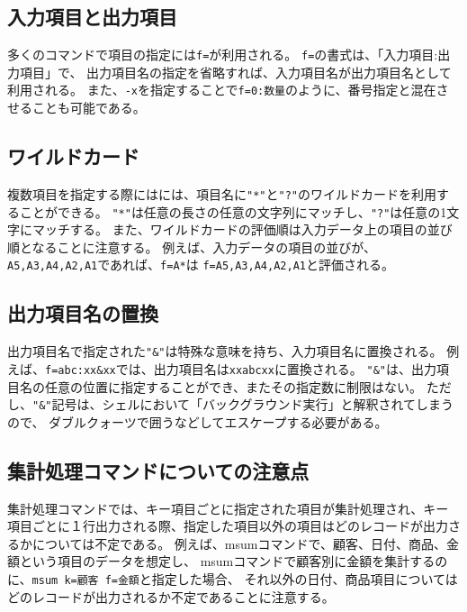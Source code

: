 

\subsection{入力項目と出力項目}

多くのコマンドで項目の指定には\verb|f=|が利用される。
\verb|f=|の書式は、「入力項目:出力項目」で、
出力項目名の指定を省略すれば、入力項目名が出力項目名として利用される。
また、\verb|-x|を指定することで\verb|f=0:数量|のように、番号指定と混在させることも可能である。



\subsection{ワイルドカード}
複数項目を指定する際にはには、項目名に\verb|"*"|と\verb|"?"|のワイルドカードを利用することができる。
\verb|"*"|は任意の長さの任意の文字列にマッチし、\verb|"?"|は任意の1文字にマッチする。
また、ワイルドカードの評価順は入力データ上の項目の並び順となることに注意する。
例えば、入力データの項目の並びが、\verb|A5,A3,A4,A2,A1|であれば、\verb|f=A*|は
\verb|f=A5,A3,A4,A2,A1|と評価される。



\subsection{出力項目名の置換}

出力項目名で指定された\verb|"&"|は特殊な意味を持ち、入力項目名に置換される。
例えば、\verb|f=abc:xx&xx|では、出力項目名は\verb|xxabcxx|に置換される。
\verb|"&"|は、出力項目名の任意の位置に指定することができ、またその指定数に制限はない。
ただし、\verb|"&"|記号は、シェルにおいて「バックグラウンド実行」と解釈されてしまうので、
ダブルクォーツで囲うなどしてエスケープする必要がある。



\subsection{集計処理コマンドについての注意点}
集計処理コマンドでは、キー項目ごとに指定された項目が集計処理され、キー項目ごとに１行出力される際、指定した項目以外の項目はどのレコードが出力さるかについては不定である。
例えば、msumコマンドで、顧客、日付、商品、金額という項目のデータを想定し、
msumコマンドで顧客別に金額を集計するのに、\verb|msum k=顧客 f=金額|と指定した場合、
それ以外の日付、商品項目についてはどのレコードが出力されるか不定であることに注意する。

%

